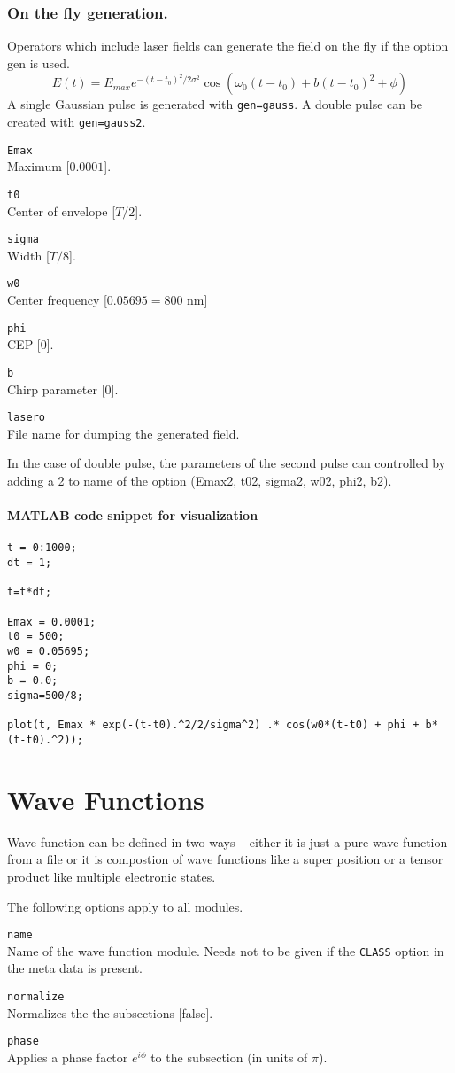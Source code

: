 \documentclass[a4paper,12pt]{scrbook}
\newcommand{\option}[2]{\item \texttt{#1}\\ #2}
\newcommand{\code}[1]{\texttt{#1}}
\begin{document}
\subsection{On the fly generation.}
Operators which include laser fields can generate the field on the fly if the option gen is used.
\begin{equation}
E(t) = E_{max} e^{-(t-t_0)^2/2\sigma^2} \cos(\omega_0 (t-t_0)+ b(t-t_0)^2+\phi) 
\end{equation}
A single Gaussian pulse is generated with \verb|gen=gauss|. A double pulse can be created with
\verb|gen=gauss2|.
\begin{options}
 \option{Emax}{Maximum [$0.0001$].}
 \option{t0}{Center of envelope [$T/2$].}
 \option{sigma}{Width [$T/8$].}
 \option{w0}{Center frequency [$0.05695 = 800$ nm]}
 \option{phi}{CEP [0].}
 \option{b}{Chirp parameter [0].}
 \option{lasero}{File name for dumping the generated field.}
\end{options}
In the case of double pulse, the parameters of the second pulse can controlled by adding a 2 to
name of the option (Emax2, t02, sigma2, w02, phi2, b2).

\subsubsection*{MATLAB code snippet for visualization}
\begin{verbatim}
t = 0:1000;
dt = 1;

t=t*dt;

Emax = 0.0001;
t0 = 500;
w0 = 0.05695;
phi = 0;
b = 0.0;
sigma=500/8;

plot(t, Emax * exp(-(t-t0).^2/2/sigma^2) .* cos(w0*(t-t0) + phi + b*(t-t0).^2)); 
\end{verbatim}


\chapter{Wave Functions}
Wave function can be defined in two ways -- either it is just a pure wave function from a
file or it is compostion of wave functions like a super position or a tensor product like
multiple electronic states.

The following options apply to all modules.
\begin{options}
 \option{name}{Name of the wave function module. Needs not to be given if the \code{CLASS} option in the meta data is present.}
 \option{normalize}{Normalizes the the subsections [false].}
 \option{phase}{Applies a phase factor $e^{i\phi}$ to the subsection (in units of $\pi$).}
\end{options}
\end{document}
